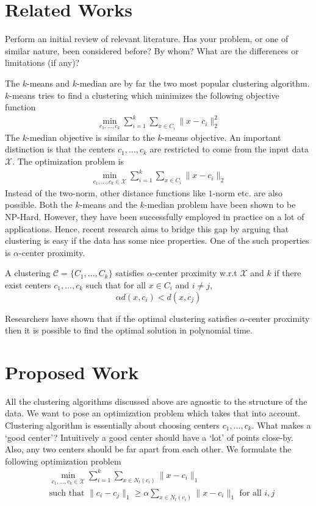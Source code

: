 \documentclass{article}
\newcommand{\mc}{\mathcal}
\begin{document}
\section{Related Works}
Perform an initial review of relevant literature. Has your problem, or one of similar nature, been considered before? By whom? What are the differences or limitations (if any)? 

The $k$-means and $k$-median are by far the two most popular clustering algorithm. $k$-means tries to find a clustering which minimizes the following objective function
\begin{align*}
	\min_{c_1, \ldots, c_k} \sum_{i=1}^k \sum_{x \in C_i} \|x-c_i\|_2^2 
\end{align*}
The $k$-median objective is similar to the $k$-means objective. An important distinction is that the centers $c_1, \ldots, c_k$ are restricted to come from the input data $\mc X$. The optimization problem is
\begin{align*}
	\min_{c_1, \ldots, c_k \in \mc X} \sum_{i=1}^k \sum_{x \in C_i} \|x-c_i\|_2 
\end{align*}
Instead of the two-norm, other distance functions like $1$-norm etc. are also possible. Both the $k$-means and the $k$-median problem have been shown to be NP-Hard. However, they have been successfully employed in practice on a lot of applications. Hence, recent research aims to bridge this gap by arguing that clustering is easy if the data has some nice properties. One of the such properties is $\alpha$-center proximity. 

A clustering $\mc C = \{C_1, \ldots, C_k\}$ satisfies $\alpha$-center proximity w.r.t $\mc X$ and $k$ if there exist centers $c_1, \ldots, c_k$  such that for all $x \in C_i$ and $i\neq j$, $$\alpha d(x, c_i) < d(x, c_j)$$

Researchers have shown that if the optimal clustering satisfies $\alpha$-center proximity then it is possible to find the optimal solution in polynomial time. 
\section{Proposed Work}
All the clustering algorithms discussed above are agnostic to the structure of the data. We want to pose an optimization problem which takes that into account. Clustering algorithm is essentially about choosing centers $c_1, \ldots, c_k$. What makes a `good center'? Intuitively a good center should have a `lot' of points close-by. Also, any two centers should be far apart from each other. We formulate the following optimization problem
\begin{align*}
	&\min_{c_1, \ldots, c_k \in \mc X} \sum_{i=1}^k \sum_{x \in N_t(c_i)} \|x-c_i\|_1 \\
	& \text{such that } \|c_i - c_j\|_1 \ge \alpha  \sum_{x \in N_t(c_i)} \|x-c_i\|_1 \text{ for all }i, j
\end{align*}
\end{document}
